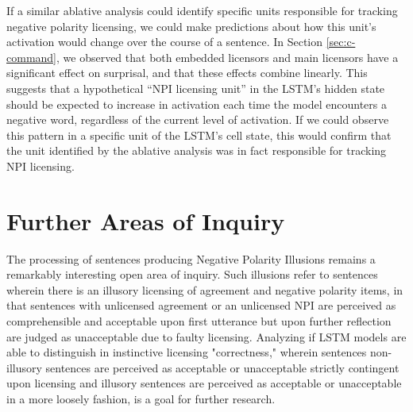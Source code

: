 \documentclass[11pt, round]{article}
\begin{document}
If a similar ablative analysis could identify specific units responsible for tracking negative polarity licensing, we could make predictions about how this unit's activation would change over the course of a sentence. In Section \ref{sec:c-command}, we observed that both embedded licensors and main licensors have a significant effect on surprisal, and that these effects combine linearly. This suggests that a hypothetical ``NPI licensing unit'' in the LSTM's hidden state should be expected to increase in activation each time the model encounters a negative word, regardless of the current level of activation. If we could observe this pattern in a specific unit of the LSTM's cell state, this would confirm that the unit identified by the ablative analysis was in fact responsible for tracking NPI licensing.

\section{Further Areas of Inquiry}

The processing of sentences producing Negative Polarity Illusions remains a remarkably interesting open area of inquiry. Such illusions refer to sentences wherein there is an illusory licensing of agreement and negative polarity items, in that sentences with unlicensed agreement or an unlicensed NPI are perceived as comprehensible and acceptable upon first utterance but upon further reflection are judged as unacceptable due to faulty licensing. Analyzing if LSTM models are able to distinguish in instinctive licensing "correctness," wherein sentences non-illusory sentences are perceived as acceptable or unacceptable strictly contingent upon licensing and illusory sentences are perceived as acceptable or unacceptable in a more loosely fashion, is a goal for further research.


\end{document}
